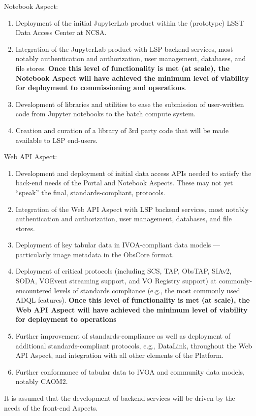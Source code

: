 Notebook Aspect:
\begin{enumerate}
	\item Deployment of the initial JupyterLab product within the (prototype) LSST Data Access Center at NCSA.
	\item Integration of the JupyterLab product with LSP backend services, most notably authentication and authorization, user management, databases, and file stores. \textbf{Once this level of functionality is met (at scale), the Notebook Aspect will have achieved the minimum level of viability for deployment to commissioning and operations}.
	\item Development of libraries and utilities to ease the submission of user-written code from Jupyter notebooks to the batch compute system.
	\item Creation and curation of a library of 3rd party code that will be made available to LSP end-users.
\end{enumerate}

Web API Aspect:
\begin{enumerate}
	\item Development and deployment of initial data access APIs needed to satisfy the back-end needs of the Portal and Notebook Aspects.
These may not yet ``speak'' the final, standards-compliant, protocols.
	\item Integration of the Web API Aspect with LSP backend services, most notably authentication and authorization, user management, databases, and file stores.
	\item Deployment of key tabular data in IVOA-compliant data models --- particularly image metadata in the ObsCore format.
	\item Deployment of critical protocols (including SCS, TAP, ObsTAP, SIAv2, SODA, VOEvent streaming support, and VO Registry support) at commonly-encountered levels of standards compliance (e.g., the most commonly used ADQL features).
\textbf{Once this level of functionality is met (at scale), the Web API Aspect will have achieved the minimum level of viability for deployment to operations}
	\item Further improvement of standards-compliance as well as deployment of additional standards-compliant protocols, e.g., DataLink, throughout the Web API Aspect, and integration with all other elements of the Platform.
	\item Further conformance of tabular data to IVOA and community data models, notably CAOM2.
\end{enumerate}

It is assumed that the development of backend services will be driven by the needs of the front-end Aspects.
